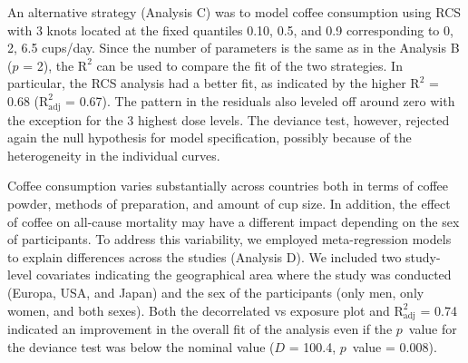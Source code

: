 \documentclass[11pt,a4paper,twoside,openany]{book}\usepackage{knitr}
\begin{document}
{{\noindent An alternative strategy (Analysis C) was to model coffee consumption using RCS with 3 knots located at the fixed quantiles 0.10, 0.5, and 0.9 corresponding to 0, 2, 6.5 cups/day. Since the number of parameters is the same as in the Analysis B ($p$ = 2), the \textrm{$\mathrm{R^2}$} can be used to compare the fit of the two strategies. In particular, the RCS analysis had a better fit, as indicated by the higher \textrm{$\mathrm{R^2}$} = 0.68 (\textrm{$\mathrm{R_{\textrm{adj}}^2}$} = 0.67). The pattern in the residuals also leveled off around zero with the exception for the 3 highest dose levels. The deviance test, however, rejected again the null hypothesis for model specification, possibly because of the heterogeneity in the individual curves. 

Coffee consumption varies substantially across countries both in terms of coffee powder, methods of preparation, and amount of cup size. In addition, the effect of coffee on all-cause mortality may have a different impact depending on the sex of participants. To address this variability, we employed meta-regression models to explain differences across the studies (Analysis D). We included two study-level covariates indicating the geographical area where the study was conducted (Europa, USA, and Japan) and the sex of the participants (only men, only women, and both sexes). Both the decorrelated vs exposure plot and \textrm{$\mathrm{R_{\textrm{adj}}^2}$} = 0.74 indicated an improvement in the overall fit of the analysis even if the $p$~value for the deviance test was below the nominal value ($D$ = 100.4, $p$~value = 0.008).

\begin{table}[!h]


\end{table}}}
\end{document}
